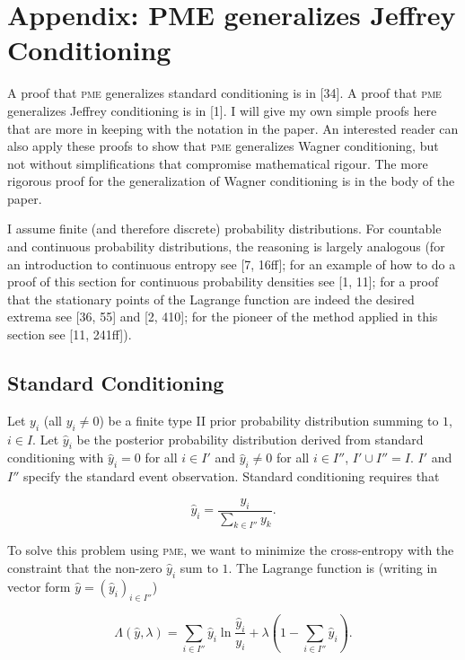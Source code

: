 \documentclass[entropy,article,submit,oneauthor,pdftex,12pt,a4paper]{mdpi}
\begin{document}
\section{Appendix: PME generalizes Jeffrey Conditioning}
\label{appendix}

A proof that \textsc{pme} generalizes standard conditioning is in
[34]. A proof that \textsc{pme} generalizes Jeffrey conditioning is in
[1]. I will give my own simple proofs here that are more in keeping
with the notation in the paper. An interested reader can also apply
these proofs to show that \textsc{pme} generalizes Wagner
conditioning, but not without simplifications that compromise
mathematical rigour. The more rigorous proof for the generalization of
Wagner conditioning is in the body of the paper.

I assume finite (and therefore discrete) probability distributions.
For countable and continuous probability distributions, the reasoning
is largely analogous (for an introduction to continuous entropy see
[7, 16ff]; for an example of how to do a proof of this section for
continuous probability densities see [1, 11]; for a proof that the
stationary points of the Lagrange function are indeed the desired
extrema see [36, 55] and [2, 410]; for the pioneer of the method
applied in this section see [11, 241ff]).

\subsection{Standard Conditioning}
\label{sc}

Let $y_{i}$ (all $y_{i}\neq{}0$) be a finite type II prior probability
distribution summing to $1$, $i\in{}I$. Let $\hat{y}_{i}$ be the
posterior probability distribution derived from standard conditioning
with $\hat{y}_{i}=0$ for all $i\in{}I'$ and $\hat{y}_{i}\neq{}0$ for
all $i\in{}I''$, $I'\cup{}I''=I$. $I'$ and $I''$ specify the standard
event observation. Standard conditioning requires that

\begin{equation}
  \label{eq:sc}
  \hat{y}_{i}=\frac{y_{i}}{\sum_{k\in{}I''}y_{k}}.
\end{equation}

{\noindent}To solve this problem using \textsc{pme}, we want to minimize the
cross-entropy with the constraint that the non-zero $\hat{y}_{i}$ sum to
$1$. The Lagrange function is (writing in vector form
$\hat{y}=(\hat{y}_{i})_{i\in{}I''}$)

\begin{equation}
  \label{eq:sclag}
  \Lambda(\hat{y},\lambda)=\sum_{i\in{}I''}\hat{y}_{i}\ln\frac{\hat{y}_{i}}{y_{i}}+\lambda\left(1-\sum_{i\in{}I''}\hat{y}_{i}\right).
\end{equation}
\end{document}
